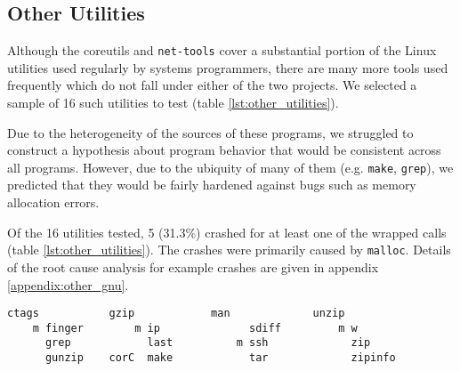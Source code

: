 \subsection{Other Utilities}
Although the coreutils and \texttt{net-tools} cover a substantial portion of the Linux utilities used regularly by systems programmers, there are many more tools used frequently which do not fall under either of the two projects. We selected a sample of 16 such utilities to test (table \ref{lst:other_utilities}).

Due to the heterogeneity of the sources of these programs, we struggled to construct a hypothesis about program behavior that would be consistent across all programs. However, due to the ubiquity of many of them (e.g. \texttt{make}, \texttt{grep}), we predicted that they would be fairly hardened against bugs such as memory allocation errors.

Of the 16 utilities tested, 5 (31.3\%) crashed for at least one of the wrapped calls (table \ref{lst:other_utilities}). The crashes were primarily caused by \texttt{malloc}. Details of the root cause analysis for example crashes are given in appendix \ref{appendix:other_gnu}.

\PreTable
\begin{lstlisting}[label={lst:other_utilities},caption={Other small-scale utilities tested; those which crashed are indicated with a letter to their left (\texttt{c/o/r} = \texttt{close/open/read}, \texttt{C} = \texttt{calloc}, \texttt{m} = \texttt{realloc}). A total of 5/16 (31.3\%) crashed for at least one call.}]
      ctags           gzip            man             unzip
    m finger        m ip              sdiff         m w
      grep            last          m ssh             zip
      gunzip    corC  make            tar             zipinfo
\end{lstlisting}
\PostTable
